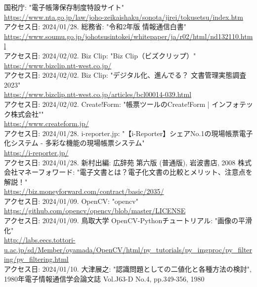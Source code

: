 \documentclass[uplatex, report, a4j, 10pt]{jsbook}
\begin{document}

%



%
\begin{thebibliography}{0}
  国税庁: "電子帳簿保存制度特設サイト"\\\url{https://www.nta.go.jp/law/joho-zeikaishaku/sonota/jirei/tokusetsu/index.htm}\\アクセス日: 2024/01/28.
  総務省: "令和2年版 情報通信白書"\\\url{https://www.soumu.go.jp/johotsusintokei/whitepaper/ja/r02/html/nd132110.html}\\アクセス日: 2024/02/02.
  Biz Clip: "Biz Clip（ビズクリップ）"\\\url{https://www.bizclip.ntt-west.co.jp/}\\アクセス日: 2024/02/02.
  Biz Clip: "デジタル化、進んでる？ 文書管理実態調査2023"\\\url{https://www.bizclip.ntt-west.co.jp/articles/bcl00014-039.html}\\アクセス日: 2024/02/02.
  Create!Form: "帳票ツールのCreate!Form | インフォテック株式会社""\\\url{https://www.createform.jp/}\\アクセス日: 2024/01/28.
  i-reporter.jp: "【i-Reporter】シェアNo.1の現場帳票電子化システム - 多彩な機能の現場帳票システム"\\\url{https://i-reporter.jp/}\\アクセス日: 2024/01/28.
  新村出編: 広辞苑 第六版 (普通版), 岩波書店, 2008
  株式会社マネーフォワード: "電子文書とは？電子化文書の比較とメリット、注意点を解説！"\\\url{https://biz.moneyforward.com/contract/basic/2035/}\\アクセス日: 2024/01/09.
  OpenCV: "opencv"\\\url{https://github.com/opencv/opencv/blob/master/LICENSE}\\アクセス日: 2024/01/09.
  鳥取大学 OpenCV-Pythonチュートリアル: "画像の平滑化"\\\url{http://labs.eecs.tottori-u.ac.jp/sd/Member/oyamada/OpenCV/html/py_tutorials/py_imgproc/py_filtering/py_filtering.html}\\アクセス日: 2024/01/10.
  大津展之: "認識問題としての二値化と各種方法の検討", 1980年電子情報通信学会論文誌 Vol.J63-D No.4, pp.349-356, 1980

\end{thebibliography}
\end{document}
